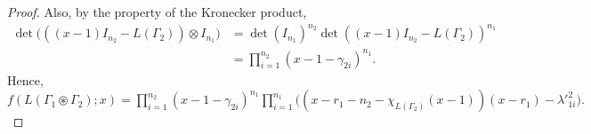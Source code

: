 \documentclass[10pt,a4paper]{amsart}
\begin{document}
\begin{proof}
        Also, by the property of the Kronecker product,
        \begin{equation*}
            \begin{split}
                \det\big(((x-1)I_{n_2}-L(\Gamma_2))\otimes I_{n_1}\big)&=\det(I_{n_1})^{n_2}\det((x-1)I_{n_2}-L(\Gamma_2))^{n_1}\\
                &=\prod_{i=1}^{n_2}(x-1-\gamma_{2i})^{n_1}.
            \end{split}
        \end{equation*}
        Hence, $f(L(\Gamma_1\circledast\Gamma_2);x)=\prod_{i=1}^{n_2}(x-1-\gamma_{2i})^{n_1} \prod_{i=1}^{n_1}\big((x-r_1-n_2-\chi_{L(\Gamma_2)}(x-1))(x-r_1)-{\lambda'}_{1i}^2\big).$
    \end{proof}
\end{document}

